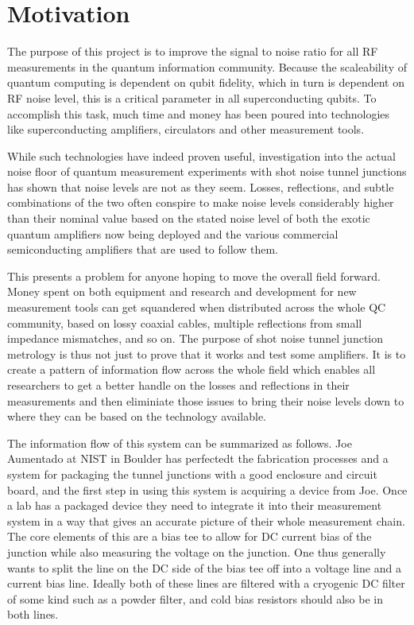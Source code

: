 \documentclass[11pt]{article}
\begin{document}
\section{Motivation}



    The purpose of this project is to improve the signal to noise ratio for all RF measurements in the quantum information community.  Because the scaleability of quantum computing is dependent on qubit fidelity, which in turn is dependent on RF noise level, this is a critical parameter in all superconducting qubits.  To accomplish this task, much time and money has been poured into technologies like superconducting amplifiers, circulators and other measurement tools. 
 



     While such technologies have indeed proven useful, investigation into the actual noise floor of quantum measurement experiments with shot noise tunnel junctions has shown that noise levels are not as they seem.  Losses, reflections, and subtle combinations of the two often conspire to make noise levels considerably higher than their nominal value based on the stated noise level of both the exotic quantum amplifiers now being deployed and the various commercial semiconducting amplifiers that are used to follow them. 




    This presents a problem for anyone hoping to move the overall field forward.  Money spent on both equipment and research and development for new measurement tools can get squandered when distributed across the whole QC community, based on lossy coaxial cables, multiple reflections from small impedance mismatches, and so on.  The purpose of shot noise tunnel junction metrology is thus not just to prove that it works and test some amplifiers.  It is to create a pattern of information flow across the whole field which enables all researchers to get a better handle on the losses and reflections in their measurements and then eliminiate those issues to bring their noise levels down to where they can be based on the technology available.  



The information flow of this system can be summarized as follows.  Joe Aumentado at NIST in Boulder has perfectedt the fabrication processes and a system for packaging the tunnel junctions with a good enclosure and circuit board, and the first step in using this system is acquiring a device from Joe.  Once a lab has a packaged device they need to integrate it into their measurement system in a way that gives an accurate picture of their whole measurement chain.  The core elements of this are a bias tee to allow for DC current bias of the junction while also measuring the voltage on the junction.  One thus generally wants to split the line on the DC side of the bias tee off into a voltage line and a current bias line.  Ideally both of these lines are filtered with a cryogenic DC filter of some kind such as a powder filter, and cold bias resistors should also be in both lines.
\end{document}
